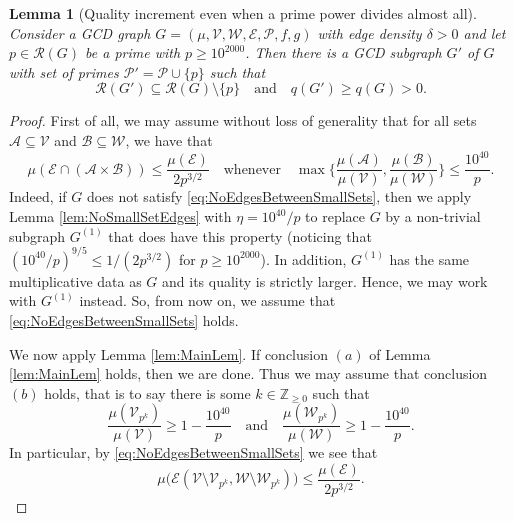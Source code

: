 \documentclass[12pt]{amsart}
\numberwithin{equation}{section}
\newtheorem{lem}{Lemma}[section]
\theoremstyle{definition}
\theoremstyle{remark}
\newcommand{\Z}{\mathbb{Z}}
\newcommand{\CA}{\mathcal{A}}
\newcommand{\CB}{\mathcal{B}}
\newcommand{\CE}{\mathcal{E}}
\newcommand{\CP}{\mathcal{P}}
\newcommand{\CR}{\mathcal{R}}
\newcommand{\CV}{\mathcal{V}}
\newcommand{\CW}{\mathcal{W}}
\renewcommand{\le}{\leqslant}
\renewcommand{\ge}{\geqslant}
\begin{document}
\begin{lem}[Quality increment even when a prime power divides almost all]\label{lem:MainLem2} 
Consider a GCD graph $G=(\mu,\CV,\CW,\CE,\CP,f,g)$ with edge density $\delta>0$ and let $p\in\CR(G)$ be a prime with $p\ge 10^{2000}$. Then there is a GCD subgraph $G'$ of $G$ with set of primes $\CP'=\CP\cup\{p\}$ such that
\[
\CR(G')\subseteq\CR(G)\setminus\{p\}
\quad\text{and}\quad  q(G')\ge q(G)>0.
\]
\end{lem}

\begin{proof} First of all, we may assume without loss of generality that for all sets $\CA\subseteq \CV$ and $\CB\subseteq \CW$, we have that 
\begin{equation}\label{eq:NoEdgesBetweenSmallSets}
\mu(\CE\cap(\CA\times \CB)) \le \frac{\mu(\CE)}{2p^{3/2}} 
\quad\text{whenever}\quad \max\bigg\{ \frac{\mu(\CA)}{\mu(\CV)}, \frac{\mu(\CB)}{\mu(\CW)} \bigg\} \le \frac{10^{40}}{p} .
\end{equation}
Indeed, if $G$ does not satisfy \eqref{eq:NoEdgesBetweenSmallSets}, then we apply Lemma \ref{lem:NoSmallSetEdges} with $\eta=10^{40}/p$ to replace $G$ by a non-trivial subgraph $G^{(1)}$ that does have this property (noticing that $(10^{40}/p)^{9/5}\le 1/(2p^{3/2})$ for $p\ge 10^{2000}$). In addition, $G^{(1)}$ has the same multiplicative data as $G$ and its quality is strictly larger. Hence, we may work with $G^{(1)}$ instead. So, from now on, we assume that \eqref{eq:NoEdgesBetweenSmallSets} holds. 

We now apply Lemma \ref{lem:MainLem}. If conclusion $(a)$ of Lemma \ref{lem:MainLem} holds, then we are done. Thus we may assume that conclusion $(b)$ holds, that is to say there is some $k\in\Z_{\ge0}$ such that 
\[
\frac{\mu(\CV_{p^k})}{\mu(\CV)}\ge1-\frac{10^{40}}{p}
\quad\text{and}\quad
\frac{\mu(\CW_{p^k})}{\mu(\CW)}\ge 1-\frac{10^{40}}{p}.
\]
In particular, by \eqref{eq:NoEdgesBetweenSmallSets} we see that
\begin{equation}\label{eq:NoBadEdges1}
\mu\big(\CE(\CV\setminus\CV_{p^k},\CW\setminus \CW_{p^k})\big) 
\le \frac{\mu(\CE)}{2p^{3/2}}.
\end{equation}


\end{proof}
\end{document}
